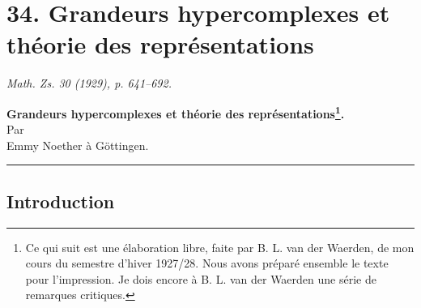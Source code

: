 
\providecommand{\mG}{\mathfrak{G}}
\providecommand{\mA}{\mathfrak{A}}
\providecommand{\mB}{\mathfrak{B}}
\providecommand{\mC}{\mathfrak{C}}
\providecommand{\mD}{\mathfrak{D}}
\providecommand{\mE}{\mathfrak{E}}
\providecommand{\mH}{\mathfrak{H}}
\providecommand{\mK}{\mathfrak{K}}
\providecommand{\mM}{\mathfrak{M}}
\providecommand{\mN}{\mathfrak{N}}
\providecommand{\mR}{\mathfrak{R}}
\providecommand{\mS}{\mathfrak{S}}
\providecommand{\mT}{\mathfrak{T}}
\providecommand{\mU}{\mathfrak{U}}
\providecommand{\mO}{\mathfrak{O}}
\providecommand{\mo}{\mathfrak{o}}
\providecommand{\OO}{\Omega}
\providecommand{\Th}{\Theta}
\providecommand{\iso}{\simeq}
\providecommand{\normlhd}{\triangleleft}

\setcounter{footnote}{0}

\section*{34. Grandeurs hypercomplexes et théorie des représentations}
\emph{Math. Zs. 30 (1929), p. 641--692.}

\begin{center}
{\Large\bfseries Grandeurs hypercomplexes et théorie des représentations\footnote{Ce qui suit est une élaboration libre, faite par B. L. van der Waerden, de mon cours du semestre d'hiver 1927/28. Nous avons préparé ensemble le texte pour l'impression. Je dois encore à B. L. van der Waerden une série de remarques critiques.}.}\\[1em]
Par\\[0.5em]
Emmy Noether à Göttingen.\\[0.8em]
\rule{3em}{0.4pt}
\end{center}

\subsection*{Introduction}

